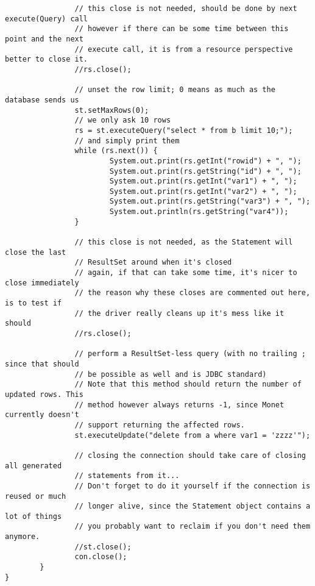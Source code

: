 \documentclass{article}
\begin{document}
\begin{verbatim}
                // this close is not needed, should be done by next execute(Query) call
                // however if there can be some time between this point and the next
                // execute call, it is from a resource perspective better to close it.
                //rs.close();
                
                // unset the row limit; 0 means as much as the database sends us
                st.setMaxRows(0);
                // we only ask 10 rows
                rs = st.executeQuery("select * from b limit 10;");
                // and simply print them
                while (rs.next()) {
                        System.out.print(rs.getInt("rowid") + ", ");
                        System.out.print(rs.getString("id") + ", ");
                        System.out.print(rs.getInt("var1") + ", ");
                        System.out.print(rs.getInt("var2") + ", ");
                        System.out.print(rs.getString("var3") + ", ");
                        System.out.println(rs.getString("var4"));
                }
                
                // this close is not needed, as the Statement will close the last
                // ResultSet around when it's closed
                // again, if that can take some time, it's nicer to close immediately
                // the reason why these closes are commented out here, is to test if
                // the driver really cleans up it's mess like it should
                //rs.close();

                // perform a ResultSet-less query (with no trailing ; since that should
                // be possible as well and is JDBC standard)
                // Note that this method should return the number of updated rows. This
                // method however always returns -1, since Monet currently doesn't
                // support returning the affected rows.
                st.executeUpdate("delete from a where var1 = 'zzzz'");

                // closing the connection should take care of closing all generated
                // statements from it...
                // Don't forget to do it yourself if the connection is reused or much
                // longer alive, since the Statement object contains a lot of things
                // you probably want to reclaim if you don't need them anymore.
                //st.close();
                con.close();
        }
}
\end{verbatim}
\end{document}

